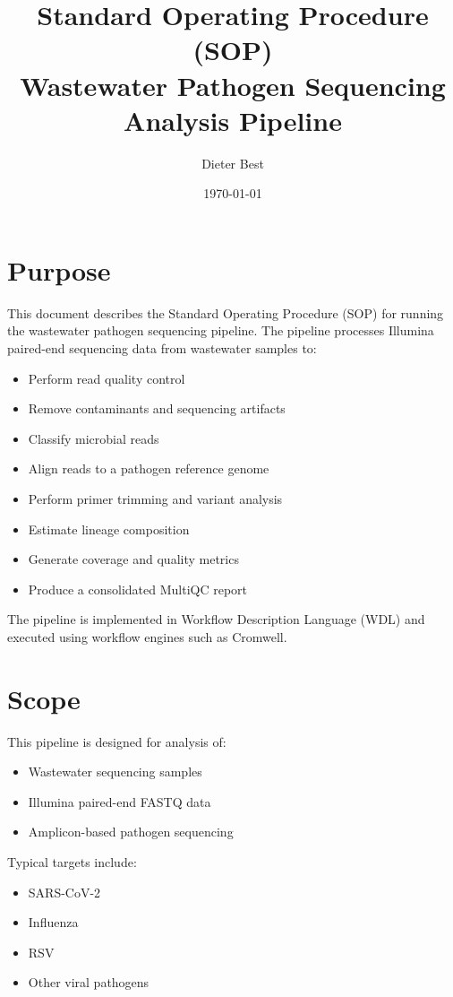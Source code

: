 \documentclass[11pt]{article}
\title{Standard Operating Procedure (SOP)\\Wastewater Pathogen Sequencing Analysis Pipeline}
\author{Dieter Best}
\date{\today}
\begin{document}
\maketitle

\section{Purpose}
This document describes the Standard Operating Procedure (SOP) for running the wastewater pathogen sequencing pipeline. The pipeline processes Illumina paired-end sequencing data from wastewater samples to:

\begin{itemize}
\item Perform read quality control
\item Remove contaminants and sequencing artifacts
\item Classify microbial reads
\item Align reads to a pathogen reference genome
\item Perform primer trimming and variant analysis
\item Estimate lineage composition
\item Generate coverage and quality metrics
\item Produce a consolidated MultiQC report
\end{itemize}

The pipeline is implemented in Workflow Description Language (WDL) and executed using workflow engines such as Cromwell.

\section{Scope}

This pipeline is designed for analysis of:

\begin{itemize}
\item Wastewater sequencing samples
\item Illumina paired-end FASTQ data
\item Amplicon-based pathogen sequencing
\end{itemize}

Typical targets include:

\begin{itemize}
\item SARS-CoV-2
\item Influenza
\item RSV
\item Other viral pathogens
\end{itemize}
\end{document}
